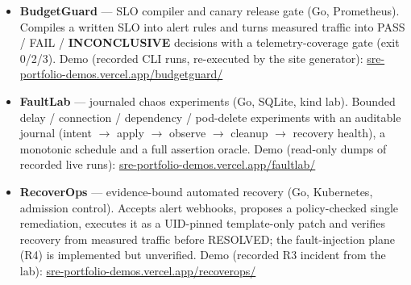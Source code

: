 %
%

\begin{itemize}

  \item \textbf{BudgetGuard} — SLO compiler and canary release gate (Go,
    Prometheus). Compiles a written SLO into alert rules and turns measured
    traffic into PASS / FAIL / \textbf{INCONCLUSIVE} decisions with a
    telemetry-coverage gate (exit 0/2/3).
    Demo (recorded CLI runs, re-executed by the site generator):
    \href{https://sre-portfolio-demos.vercel.app/budgetguard/}{sre-portfolio-demos.vercel.app/budgetguard/}

  \item \textbf{FaultLab} — journaled chaos experiments (Go, SQLite, kind lab).
    Bounded delay / connection / dependency / pod-delete experiments with an
    auditable journal (intent $\rightarrow$ apply $\rightarrow$ observe
    $\rightarrow$ cleanup $\rightarrow$ recovery health), a monotonic schedule
    and a full assertion oracle.
    Demo (read-only dumps of recorded live runs):
    \href{https://sre-portfolio-demos.vercel.app/faultlab/}{sre-portfolio-demos.vercel.app/faultlab/}

  \item \textbf{RecoverOps} — evidence-bound automated recovery (Go, Kubernetes,
    admission control). Accepts alert webhooks, proposes a policy-checked single
    remediation, executes it as a UID-pinned template-only patch and verifies
    recovery from measured traffic before RESOLVED; the fault-injection plane
    (R4) is implemented but unverified.
    Demo (recorded R3 incident from the lab):
    \href{https://sre-portfolio-demos.vercel.app/recoverops/}{sre-portfolio-demos.vercel.app/recoverops/}

\end{itemize}

